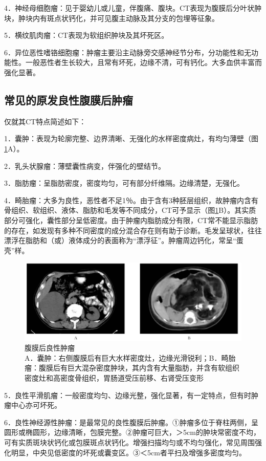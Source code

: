 4．神经母细胞瘤：见于婴幼儿或儿童，伴腹痛、腹块。CT表现为腹膜后分叶状肿块，肿块内有斑点状钙化，并可见腹主动脉及其分支的包埋等征象。

5．横纹肌肉瘤：CT表现为软组织肿块及其坏死区。

6．异位恶性嗜铬细胞瘤：肿瘤主要沿主动脉旁交感神经节分布，分功能性和无功能性。一般恶性者生长较大，且常有坏死，边缘不清，可有钙化。大多血供丰富而强化显著。

\subsection{常见的原发良性腹膜后肿瘤}

仅就其CT特点简述如下：

1．囊肿：表现为轮廓完整、边界清晰、无强化的水样密度病灶，有均匀薄壁（图\ref{fig19-3}A）。

2．乳头状腺瘤：薄壁囊性病变，伴强化的壁结节。

3．脂肪瘤：呈脂肪密度，密度均匀，可有部分纤维隔。边缘清楚，无强化。

4．畸胎瘤：大多为良性，恶性者不足1％。由于含有3种胚层组织，故肿瘤内含有骨组织、软组织、液体、脂肪和毛发等不同成分，CT可予显示（图\ref{fig19-3}B）。其实质部分可强化，囊性部分呈低密度。由于肿瘤内脂肪成分有限，CT常不能显示脂肪的存在，如发现有多种不同密度的成分混合存在则有助于诊断。毛发呈球状，往往漂浮在脂肪和（或）液体成分的表面称为“漂浮征”。肿瘤周边钙化，常呈“蛋壳”样。

\begin{figure}[!htbp]
 \centering
 \includegraphics[width=.7\textwidth,height=\textheight,keepaspectratio]{./images/Image00384.jpg}
 \captionsetup{justification=centering}
 \caption{腹膜后良性肿瘤\\{\small A．囊肿：右侧腹膜后有巨大水样密度灶，边缘光滑锐利；B．畸胎瘤：腹膜后有巨大混杂密度肿块，其内含有大量脂肪，并含有软组织密度灶和高密度骨组织，胃肠道受压前移、右肾受压变形}}
 \label{fig19-3}
  \end{figure} 

5．良性平滑肌瘤：一般密度均匀、边缘光整，强化显著，有一定特点，但有时肿瘤中心亦可坏死。

6．良性神经源性肿瘤：是最常见的良性腹膜后肿瘤。①肿瘤多位于脊柱两侧，呈圆形或椭圆形，边缘清晰，包膜完整。②肿瘤可巨大，＞5cm的肿块常密度不均，可有实质斑块状钙化或包膜斑点状钙化。增强扫描均匀或不均匀强化，常见周围强化明显，中央见低密度的坏死或囊变区。③＜5cm者平扫及增强多密度均匀。


